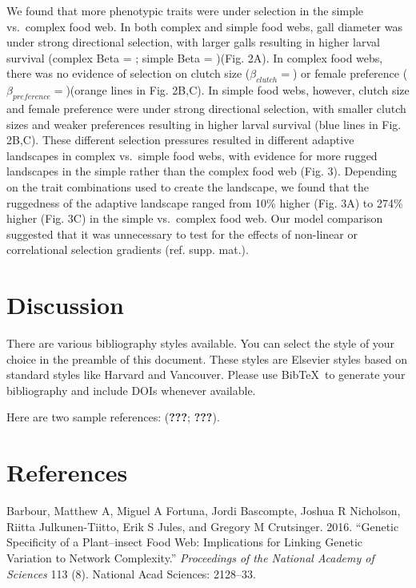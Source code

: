 \documentclass[]{elsarticle} %
\begin{document}
We found that more phenotypic traits were under selection in the simple
vs.~complex food web. In both complex and simple food webs, gall
diameter was under strong directional selection, with larger galls
resulting in higher larval survival (complex Beta = ; simple Beta =
)(Fig. 2A). In complex food webs, there was no evidence of selection on
clutch size (\(\beta_{clutch}=\)) or female preference
(\(\beta_{preference}=\))(orange lines in Fig. 2B,C). In simple food
webs, however, clutch size and female preference were under strong
directional selection, with smaller clutch sizes and weaker preferences
resulting in higher larval survival (blue lines in Fig. 2B,C). These
different selection pressures resulted in different adaptive landscapes
in complex vs.~simple food webs, with evidence for more rugged
landscapes in the simple rather than the complex food web (Fig. 3).
Depending on the trait combinations used to create the landscape, we
found that the ruggedness of the adaptive landscape ranged from 10\%
higher (Fig. 3A) to 274\% higher (Fig. 3C) in the simple vs.~complex
food web. Our model comparison suggested that it was unnecessary to test
for the effects of non-linear or correlational selection gradients (ref.
supp. mat.).

\section{Discussion}\label{discussion}

There are various bibliography styles available. You can select the
style of your choice in the preamble of this document. These styles are
Elsevier styles based on standard styles like Harvard and Vancouver.
Please use BibTeX~to generate your bibliography and include DOIs
whenever available.

Here are two sample references: ({\textbf{???}}; {\textbf{???}}).

\section*{References}\label{references}

\hypertarget{refs}{}
\hypertarget{ref-Barbour2016}{}
Barbour, Matthew A, Miguel A Fortuna, Jordi Bascompte, Joshua R
Nicholson, Riitta Julkunen-Tiitto, Erik S Jules, and Gregory M
Crutsinger. 2016. ``Genetic Specificity of a Plant--insect Food Web:
Implications for Linking Genetic Variation to Network Complexity.''
\emph{Proceedings of the National Academy of Sciences} 113 (8). National
Acad Sciences: 2128--33.
\end{document}
